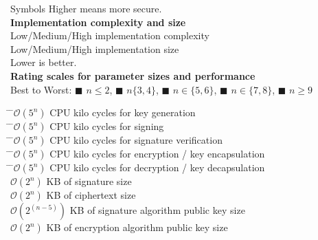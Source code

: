 \documentclass[11pt,english,a4paper, landscape]{scrartcl}
\begin{document}
\begin{minipage}[t]{0.4\textwidth}
\begin{algorithmbox}{Symbols}
			Higher means more secure.\\[\baselineskip]

			{\bfseries Implementation complexity and size}\\[0.5\baselineskip]
			 Low/Medium/High implementation complexity\\
			 Low/Medium/High implementation size\\[\baselineskip]
			Lower is better.\\[\baselineskip]

			{\bfseries Rating scales for parameter sizes and performance}\\[0.5\baselineskip]
			Best to Worst: \textcolor{themegreen}{$\blacksquare$} $n\leq2$, \textcolor{themeyellow}{$\blacksquare$} $n\{3,4\}$, \textcolor{themeorange}{$\blacksquare$} $n\in\{5,6\}$, \textcolor{themered}{$\blacksquare$} $n\in\{7,8\}$, \textcolor{themered!65!black}{$\blacksquare$} $n\geq9$
			\begin{tabbing}
				\=
				\=$\mathcal{O}(5^n)$ CPU kilo cycles for key generation\\
				\=
				\=$\mathcal{O}(5^n)$ CPU kilo cycles for signing\\
				\=
				\=$\mathcal{O}(5^n)$ CPU kilo cycles for signature verification\\
				\=
				\=$\mathcal{O}(5^n)$ CPU kilo cycles for encryption / key encapsulation\\
				\=
				\=$\mathcal{O}(5^n)$ CPU kilo cycles for decryption / key decapsulation\\
				\>
				\>$\mathcal{O}(2^n)$ KB of signature size\\
				\>
				\> $\mathcal{O}(2^n)$ KB of ciphertext size\\
				\>
				\> $\mathcal{O}(2^{(n-5)})$ KB of signature algorithm public key size\\
				\>
				\> $\mathcal{O}(2^n)$ KB of encryption algorithm public key size\\
			\end{tabbing}
			\vspace{-6mm}
		\end{algorithmbox}
	\end{minipage}
\end{document}
